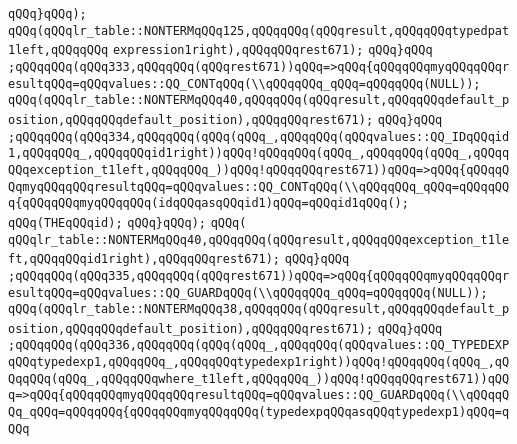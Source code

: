 \verb|qQQq}qQQq);|\newline
\verb|qQQq(qQQqlr_table::NONTERMqQQq125,qQQqqQQq(qQQqresult,qQQqqQQqtypedpat1left,qQQqqQQq|\newline
\verb|expression1right),qQQqqQQqrest671);|\newline
\verb|qQQq}qQQq|\newline
\verb|;qQQqqQQq(qQQq333,qQQqqQQq(qQQqrest671))qQQq=>qQQq{qQQqqQQqmyqQQqqQQqresultqQQq=qQQqvalues::QQ_CONTqQQq(\\qQQqqQQq_qQQq=qQQqqQQq(NULL));|\newline
\verb|qQQq(qQQqlr_table::NONTERMqQQq40,qQQqqQQq(qQQqresult,qQQqqQQqdefault_position,qQQqqQQqdefault_position),qQQqqQQqrest671);|\newline
\verb|qQQq}qQQq|\newline
\verb|;qQQqqQQq(qQQq334,qQQqqQQq(qQQq(qQQq_,qQQqqQQq(qQQqvalues::QQ_IDqQQqid1,qQQqqQQq_,qQQqqQQqid1right))qQQq!qQQqqQQq(qQQq_,qQQqqQQq(qQQq_,qQQqqQQqexception_t1left,qQQqqQQq_))qQQq!qQQqqQQqrest671))qQQq=>qQQq{qQQqqQQqmyqQQqqQQqresultqQQq=qQQqvalues::QQ_CONTqQQq(\\qQQqqQQq_qQQq=qQQqqQQq{qQQqqQQqmyqQQqqQQq(idqQQqasqQQqid1)qQQq=qQQqid1qQQq();|\newline
\verb|qQQq(THEqQQqid);|\newline
\verb|qQQq}qQQq);|\newline
\verb|qQQq(|\newline
\verb|qQQqlr_table::NONTERMqQQq40,qQQqqQQq(qQQqresult,qQQqqQQqexception_t1left,qQQqqQQqid1right),qQQqqQQqrest671);|\newline
\verb|qQQq}qQQq|\newline
\verb|;qQQqqQQq(qQQq335,qQQqqQQq(qQQqrest671))qQQq=>qQQq{qQQqqQQqmyqQQqqQQqresultqQQq=qQQqvalues::QQ_GUARDqQQq(\\qQQqqQQq_qQQq=qQQqqQQq(NULL));|\newline
\verb|qQQq(qQQqlr_table::NONTERMqQQq38,qQQqqQQq(qQQqresult,qQQqqQQqdefault_position,qQQqqQQqdefault_position),qQQqqQQqrest671);|\newline
\verb|qQQq}qQQq|\newline
\verb|;qQQqqQQq(qQQq336,qQQqqQQq(qQQq(qQQq_,qQQqqQQq(qQQqvalues::QQ_TYPEDEXPqQQqtypedexp1,qQQqqQQq_,qQQqqQQqtypedexp1right))qQQq!qQQqqQQq(qQQq_,qQQqqQQq(qQQq_,qQQqqQQqwhere_t1left,qQQqqQQq_))qQQq!qQQqqQQqrest671))qQQq=>qQQq{qQQqqQQqmyqQQqqQQqresultqQQq=qQQqvalues::QQ_GUARDqQQq(\\qQQqqQQq_qQQq=qQQqqQQq{qQQqqQQqmyqQQqqQQq(typedexpqQQqasqQQqtypedexp1)qQQq=qQQq|\newline
